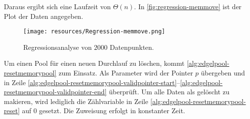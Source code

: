 Daraus ergibt sich eine Laufzeit von $\Theta(n)$. In \autoref{fig:regression-memmove} ist der Plot der Daten angegeben.

\begin{figure}[!ht]
	\centering
	\texttt{[image: resources/Regression-memmove.png]}
	\caption{Regressionsanalyse von $2000$ Datenpunkten.}
	\label{fig:regression-memmove}
\end{figure}

Um einen Pool für einen neuen Durchlauf zu löschen, kommt \autoref{alg:edgelpool-resetmemorypool} zum Einsatz. Als
 Parameter wird der Pointer $p$ übergeben und in Zeile
 \ref{alg:edgelpool-resetmemorypool-validpointer-start}--\ref{alg:edgelpool-resetmemorypool-validpointer-end}
 überprüft. Um alle Daten als gelöscht zu makieren, wird lediglich die Zählvariable in Zeile
 \ref{alg:edgelpool-resetmemorypool-reset} auf $0$ gesetzt. Die Zuweisung erfolgt in konstanter Zeit.















